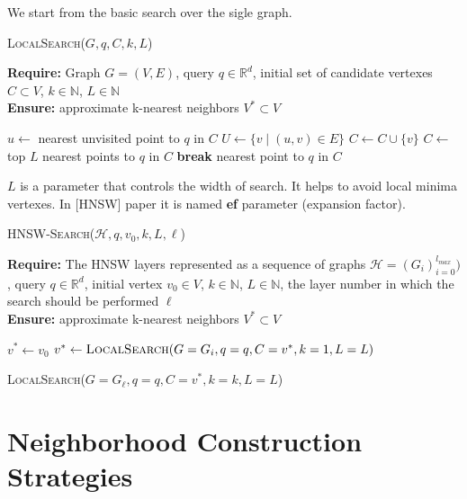 \documentclass{article}
\begin{document}
We start from the basic search over the sigle graph. 

\begin{algorithm}
\caption{\textsc{LocalSearch}($G, q, C, k, L$)}\label{alg:local_search}
\textbf{Require:} Graph $G = (V, E)$, query $q \in \mathbb{R}^d$, initial set of candidate vertexes $C \subset V$,  $k \in \mathbb{N}$, $L \in \mathbb{N}$ \\
\textbf{Ensure:} approximate k-nearest neighbors $V^* \subset V$
\begin{algorithmic}[1]
    \State $u \gets$ nearest unvisited point to $q$ in $C$
    \State $U \gets \{v \mid (u, v) \in E\}$
            \State $C \gets C \cup \{v\}$
        \EndIf
    \EndFor
        \State $C \gets$ top $L$ nearest points to $q$ in $C$
    \EndIf
        \State \textbf{break}
    \EndIf
\EndWhile
\State \Return nearest point to $q$ in $C$
\end{algorithmic}
\end{algorithm}

$L$ is a parameter that controls the width of search. 
It helps to avoid local minima vertexes. In [HNSW] paper it is named \textbf{ef} parameter (expansion factor). 



\begin{algorithm}
\caption{\textsc{HNSW-Search}($\mathcal{H}, q, v_0, k, L, \ell $)}\label{alg:hnsw_search}
\textbf{Require:} The HNSW layers represented as  a sequence of graphs $\mathcal{H} = (G_i)_{i=0}^{l_{max}} )$, query $q \in \mathbb{R}^d$, initial vertex $v_0 \in V$,  $k \in \mathbb{N}$, $L \in \mathbb{N}$, the layer number in which the search should be performed $\ell$ \\    
\textbf{Ensure:} approximate k-nearest neighbors $V^* \subset V$
\begin{algorithmic}[1]

\State $v^* \gets v_0$ 
    \State $v^* \gets \textsc{LocalSearch}(G=G_i, q=q, C={v^*}, k=1, L=L)$
\EndFor

\State \Return \textsc{LocalSearch}($ G=G_{\ell}, q=q, C={v^*}, k=k, L=L$)
\end{algorithmic}
\end{algorithm}

\section {Neighborhood Construction Strategies}
\end{document}
